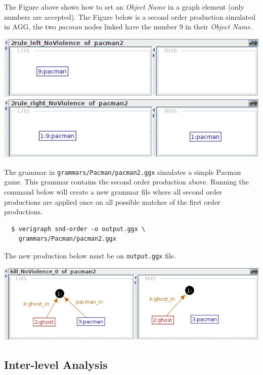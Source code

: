 \documentclass[12pt]{article}
\begin{document}
The Figure above shows how to set an \emph{Object Name} in a graph element (only numbers are accepted).
The Figure below is a second order production simulated in AGG, the two \emph{pacman} nodes linked have the number 9 in their \emph{Object Name}.

\begin{center}
\noindent\includegraphics[scale = 0.6]{noViolenceLeft.png}\\
\noindent\includegraphics[scale = 0.6]{noViolenceRight.png}\\
\end{center}

The grammar in \texttt{grammars/Pacman/pacman2.ggx} simulates a simple Pacman game.
This grammar contains the second order production above.
Running the command below will create a new grammar file where all second order productions are applied once on all possible matches of the first order productions.

\begin{verbatim}
  $ verigraph snd-order -o output.ggx \
  	grammars/Pacman/pacman2.ggx
\end{verbatim}

The new production below must be on \texttt{output.ggx} file.

{\noindent\centering\includegraphics[scale = 0.5]{kill.png}\\}

\subsection{Inter-level Analysis}
\end{document}
